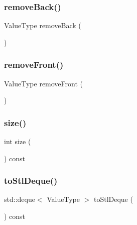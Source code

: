 \subsubsection{\texorpdfstring{remove\+Back()}{removeBack()}}
{\footnotesize\ttfamily Value\+Type remove\+Back (\begin{DoxyParamCaption}{ }\end{DoxyParamCaption})}

\mbox{\label{classDeque_a02453aa96e93c38ca4c1d176307c8a63}} 
\subsubsection{\texorpdfstring{remove\+Front()}{removeFront()}}
{\footnotesize\ttfamily Value\+Type remove\+Front (\begin{DoxyParamCaption}{ }\end{DoxyParamCaption})}

\mbox{\label{classDeque_af9593d4a5ff4274efaf429cb4f9e57cc}} 
\subsubsection{\texorpdfstring{size()}{size()}}
{\footnotesize\ttfamily int size (\begin{DoxyParamCaption}{ }\end{DoxyParamCaption}) const}

\mbox{\label{classDeque_a577546d159bb5d7237f506789f2beafd}} 
\subsubsection{\texorpdfstring{to\+Stl\+Deque()}{toStlDeque()}}
{\footnotesize\ttfamily std\+::deque$<$ Value\+Type $>$ to\+Stl\+Deque (\begin{DoxyParamCaption}{ }\end{DoxyParamCaption}) const}

\mbox{\label{classDeque_a1fe5121d6528fdea3f243321b3fa3a49}} 
